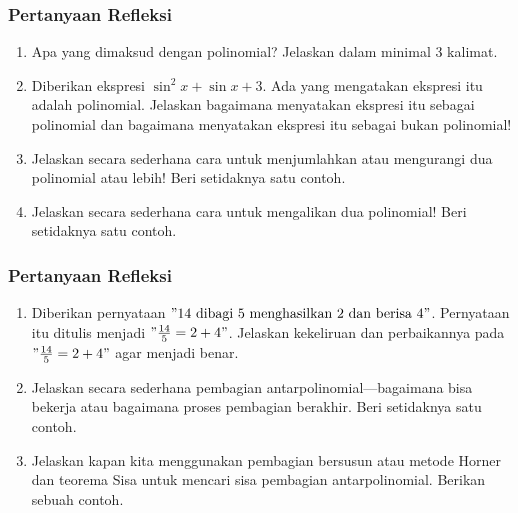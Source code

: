 \documentclass[11pt]{beamer}
\newcounter{saveenumi}
\newcommand{\seti}{\setcounter{saveenumi}{\value{enumi}}}
\newcommand{\conti}{\setcounter{enumi}{\value{saveenumi}}}
\begin{document}
	\begin{frame}
		\frametitle{Pertanyaan Refleksi}
		\begin{enumerate}
			\item Apa yang dimaksud dengan polinomial? Jelaskan dalam minimal 3 kalimat.
			\item Diberikan ekspresi $\sin^2x+\sin x+3$. Ada yang mengatakan ekspresi itu adalah polinomial. Jelaskan bagaimana menyatakan ekspresi itu sebagai polinomial dan bagaimana menyatakan ekspresi itu sebagai bukan polinomial!
			\item Jelaskan secara sederhana cara untuk menjumlahkan atau mengurangi dua polinomial atau lebih! Beri setidaknya satu contoh.
			\item Jelaskan secara sederhana cara untuk mengalikan dua polinomial! Beri setidaknya satu contoh.
			  
			\seti
		\end{enumerate}
	\end{frame}
	
	\begin{frame}
		\frametitle{Pertanyaan Refleksi}
		\begin{enumerate}
			\conti
			\item Diberikan pernyataan $"14 \text{ dibagi } 5 \text{ menghasilkan } 2\text{ dan}\text{ berisa }4"$. Pernyataan itu ditulis menjadi $"\frac{14}{5}=2+4"$. Jelaskan kekeliruan dan perbaikannya pada $"\frac{14}{5}=2+4"$ agar menjadi benar.
			\item Jelaskan secara sederhana pembagian antarpolinomial---bagaimana bisa bekerja atau bagaimana proses pembagian berakhir. Beri setidaknya satu contoh.
			
			\item Jelaskan kapan kita menggunakan pembagian bersusun atau metode Horner dan teorema Sisa untuk mencari sisa pembagian antarpolinomial. Berikan sebuah contoh.
			
			
			\seti
		\end{enumerate}
	
	\end{frame}
	
\end{document}

